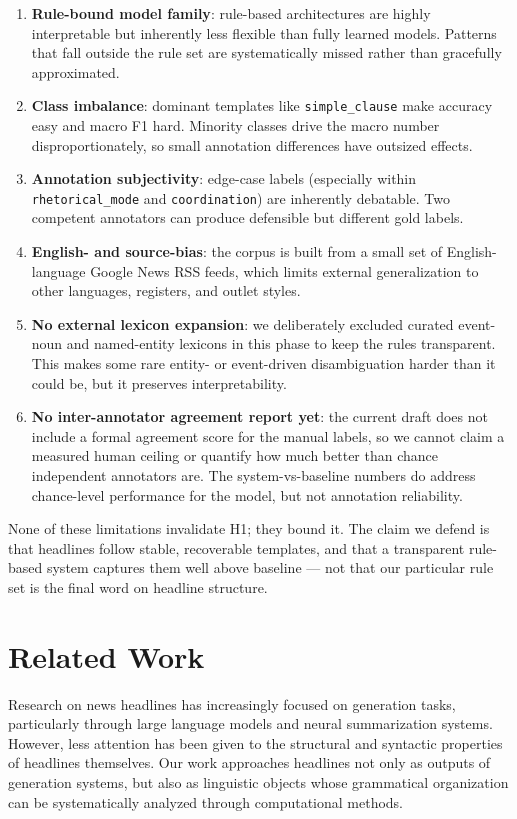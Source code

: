 \documentclass[11pt]{article}
\begin{document}
\begin{enumerate}
    \item \textbf{Rule-bound model family}: rule-based architectures are highly interpretable but inherently less flexible than fully learned models. Patterns that fall outside the rule set are systematically missed rather than gracefully approximated.
    \item \textbf{Class imbalance}: dominant templates like \texttt{simple\_clause} make accuracy easy and macro F1 hard. Minority classes drive the macro number disproportionately, so small annotation differences have outsized effects.
    \item \textbf{Annotation subjectivity}: edge-case labels (especially within \texttt{rhetorical\_mode} and \texttt{coordination}) are inherently debatable. Two competent annotators can produce defensible but different gold labels.
    \item \textbf{English- and source-bias}: the corpus is built from a small set of English-language Google News RSS feeds, which limits external generalization to other languages, registers, and outlet styles.
    \item \textbf{No external lexicon expansion}: we deliberately excluded curated event-noun and named-entity lexicons in this phase to keep the rules transparent. This makes some rare entity- or event-driven disambiguation harder than it could be, but it preserves interpretability.
    \item \textbf{No inter-annotator agreement report yet}: the current draft does not include a formal agreement score for the manual labels, so we cannot claim a measured human ceiling or quantify how much better than chance independent annotators are. The system-vs-baseline numbers do address chance-level performance for the model, but not annotation reliability.
\end{enumerate}

None of these limitations invalidate H1; they bound it. The claim we defend is that headlines follow stable, recoverable templates, and that a transparent rule-based system captures them well above baseline --- not that our particular rule set is the final word on headline structure.

\section{Related Work}
Research on news headlines has increasingly focused on generation tasks, particularly through large language models and neural summarization systems. However, less attention has been given to the structural and syntactic properties of headlines themselves. Our work approaches headlines not only as outputs of generation systems, but also as linguistic objects whose grammatical organization can be systematically analyzed through computational methods.
\end{document}
